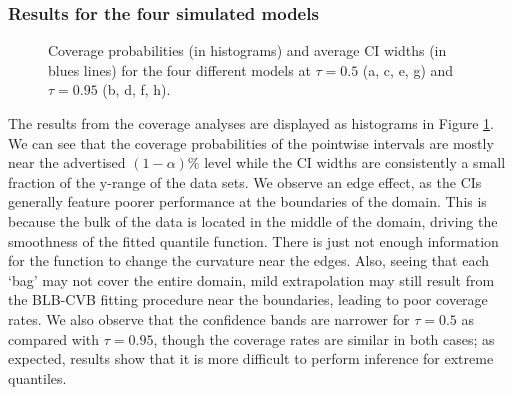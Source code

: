 \documentclass{statsoc}
\begin{document}
\subsubsection{Results for the four simulated models}
\begin{figure}
\centering   
  
  
  
\caption{Coverage probabilities (in histograms) and average CI widths (in blues lines) for the four different models at $\tau=0.5$ (a, c, e, g) and $\tau=0.95$ (b, d, f, h).}
\label{fig:coverProb}
\end{figure}
The results from the coverage analyses are displayed as histograms in Figure \ref{fig:coverProb}. We can see that the coverage probabilities of the pointwise intervals are mostly near the advertised $(1-\alpha)\%$ level while the CI widths are consistently a small fraction of the y-range of the data sets. We observe an edge effect, as the CIs generally feature poorer performance at the boundaries of the domain. This is because the bulk of the data is located in the middle of the domain, driving the smoothness of the fitted quantile function. There is just not enough information for the function to change the curvature  {near the edges. Also, seeing that each `bag' may not cover the entire domain, mild extrapolation may still result from the BLB-CVB fitting procedure near the boundaries, leading to poor coverage rates.}   {We also observe that the confidence bands are narrower for $\tau=0.5$ as compared with $\tau=0.95$, though the coverage rates are similar in both cases;  as expected,} results show that it is more difficult to perform inference for extreme quantiles.
\end{document}
